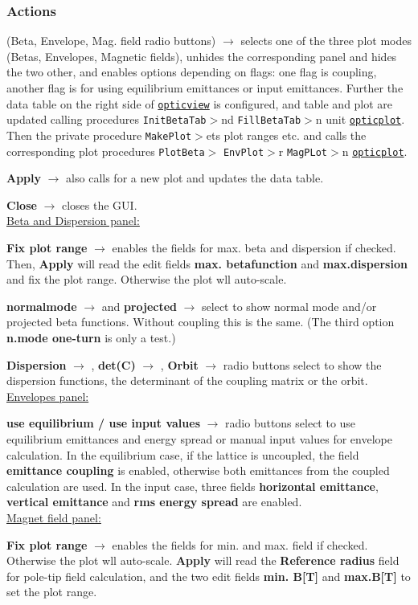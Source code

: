 \documentclass[12pt]{article}
\newcommand\code[1]{{\tt #1}}
\newcommand{\ofld}[1]{\colorbox{black!15}{{\bf #1}}}
\newcommand{\ofldx}[1]{\colorbox{black!15}{(#1)}}
\newcommand\guico[1]{{\color{blue}\code{#1}}}
\newcommand{\unico}[1]{{\color{burntorange}\code{#1}}}
\newcommand{\evcod}[2]{\ofld{#1} $\rightarrow$ \guico{#2}}
\newcommand{\evcodx}[2]{\ofldx{#1} $\rightarrow$ \guico{#2}}
\newcommand{\prcod}[2]{\opauni{#1}$>$\unico{#2}}
\newcommand{\opagui}[1]{\colorbox{blue!20}{\code{#1}}}
\newcommand{\ogui}[1]{\hyperref[#1]{\opagui{#1}}}
\newcommand{\opauni}[1]{\colorbox{orange!30}{\code{#1}}}
\newcommand{\ouni}[1]{\hyperref[#1]{\opauni{#1}}}
\newcommand{\act}[1]{\subsubsection*{Actions} #1}
\begin{document}
\act{
\evcodx{Beta, Envelope, Mag. field radio buttons}{rmodClick} selects one of the three plot modes (Betas, Envelopes, Magnetic fields), unhides the corresponding panel and hides the two other, and enables options depending on flags: one flag is coupling, another flag is for using equilibrium emittances or input emittances. Further the data table on the right side of \ogui{opticview} is configured, and table and plot are updated calling procedures \prcod{InitBetaTab} and \prcod{FillBetaTab} in unit \ouni{opticplot}. Then the private procedure \prcod{MakePlot} sets plot ranges etc. and calls the corresponding plot procedures \prcod{PlotBeta}, \prcod{EnvPlot} or \prcod{MagPLot} in \ouni{opticplot}.

\evcod{Apply}{butgoClick} also calls for a new plot and updates the data table.

\evcod{Close}{butcanClick} closes the GUI.\\

\underline{Beta and Dispersion panel:}

\evcod{Fix plot range}{cbxbetamaxClick} enables the fields for max. beta and dispersion if checked. Then, \ofld{Apply} will read the edit fields \ofld{max. betafunction} and \ofld{max.dispersion} and fix the plot range. Otherwise the plot wll auto-scale.

\evcod{normalmode}{chk\_betabChange} and \evcod{projected}{chk\_betxyChange} select to show normal mode and/or projected beta functions. Without coupling this is the same. (The third option \ofld{n.mode one-turn} is only a test.)

\evcod{Dispersion}{rbu\_dspChange}, \evcod{det(C)}{rbu\_cdetChange}, \evcod{Orbit}{rbu\_orbiChange} radio buttons select to show the dispersion functions, the determinant of the coupling matrix or the orbit.\\

\underline{Envelopes panel:}

\evcod{use equilibrium / use input values}{rbuClick} radio buttons select to use equilibrium emittances and energy spread or manual input values for envelope calculation. In the equilibrium case, if the lattice is uncoupled, the field \ofld{emittance coupling} is enabled, otherwise both emittances from the coupled calculation are used. In the input case, three fields \ofld{horizontal emittance}, \ofld{vertical emittance} and \ofld{rms energy spread} are enabled.\\

\underline{Magnet field panel:}

\evcod{Fix plot range}{chk\_bfieldfixClick} enables the fields for min. and max. field if checked. Otherwise the plot wll auto-scale. \ofld{Apply} will read the \ofld{Reference radius} field for pole-tip field calculation, and the two edit fields \ofld{min. B[T]} and \ofld{max.B[T]} to set the plot range. 

}
\end{document}
